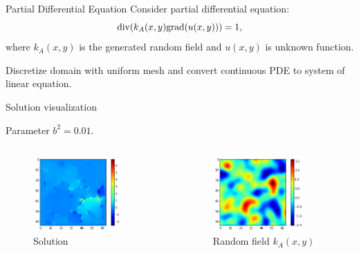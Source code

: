 \documentclass[12pt]{beamer}
\begin{document}
\begin{frame}{Partial Differential Equation}
Consider partial differential equation:
\[
{\rm div}(k_A(x, y) {\rm grad}(u(x, y))) = 1,
\]
where $k_A(x, y)$ is the generated random field and $u(x, y)$ is unknown function.

Discretize domain with uniform mesh and convert continuous PDE to system of linear equation.
\end{frame}

\begin{frame}{Solution visualization}
\begin{center}
Parameter $b^2 = 0.01$.
\end{center}

\begin{columns}
\begin{figure}[!ht]
\centering
\includegraphics[width=0.8\textwidth]{sol1e-2.png}
\caption{Solution}
\end{figure}

\begin{figure}[!ht]
\centering
\includegraphics[width=0.8\textwidth]{rand_field1e-2.png}
\caption{Random field $k_A(x, y)$}
\end{figure}
\end{columns}

\end{frame}
\end{document}
